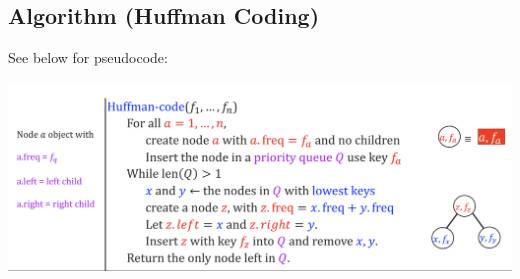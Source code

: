 	\subsection{Algorithm (Huffman Coding)} 
	See below for pseudocode:
	\begin{center}
		\includegraphics[scale=0.5]{Huffman.png}
	\end{center}
